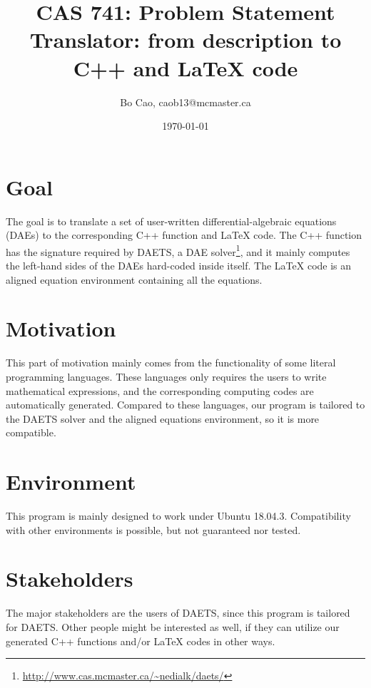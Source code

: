 \documentclass{article}
\title{CAS 741: Problem Statement\\Translator: from description to C++ and \LaTeX\xspace code}
\author{Bo Cao, caob13@mcmaster.ca}
\date{\today}
\begin{document}
\maketitle
\section{Goal}
The goal is to translate a set of user-written differential-algebraic equations (DAEs) to the corresponding C++ function and \LaTeX\xspace code. The C++ function has the signature required by DAETS, a DAE solver\footnote{\url{ http://www.cas.mcmaster.ca/~nedialk/daets/}}, and it mainly computes the left-hand sides of the DAEs hard-coded inside itself. The \LaTeX\xspace code is an aligned equation environment containing all the equations.

\section{Motivation}
This part of motivation mainly comes from the functionality of some literal programming languages. These languages only requires the users to write mathematical expressions, and the corresponding computing codes are automatically generated. Compared to these languages, our program is tailored to the DAETS solver and the aligned equations environment, so it is more compatible.

\section{Environment}
This program is mainly designed to work under Ubuntu 18.04.3. Compatibility with other environments is possible, but not guaranteed nor tested.

\section{Stakeholders}
The major stakeholders are the users of DAETS, since this program is tailored for DAETS. Other people might be interested as well, if they can utilize our generated C++ functions and/or \LaTeX\xspace codes in other ways.
 
%
%
%
%
\end{document}
